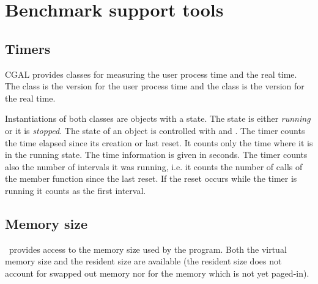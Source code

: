 
\ccParDims

\chapter{Benchmark support tools}
\label{chapterTimer}

\section{Timers}

CGAL provides classes for measuring the user process time and the real time.
The class  is the version for the user process time and
the class  is the version for the real time.

Instantiations of both classes are objects with a state. The state is
either {\em running\/} or it is {\em stopped}. The state of an object
 is controlled
with  and  . The timer counts the
time elapsed since its creation or last reset. It counts only the time
where it is in the running state. The time information is given in seconds.
The timer counts also the number of intervals it was running, i.e. it 
counts the number of calls of the  member function since the 
last reset. If the reset occurs while the timer is running it counts as the
first interval.

\section{Memory size}

\cgal\ provides access to the memory size used by the program.  Both the
virtual memory size and the resident size are available (the resident size
does not account for swapped out memory nor for the memory which is not yet
paged-in).


\ccParDims

